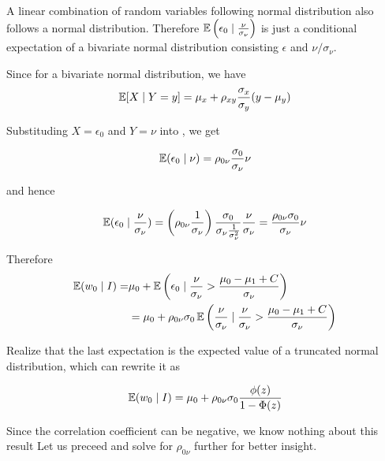 A linear combination of random variables following normal distribution
also follows a normal distribution. Therefore $\operatorname{\mathbb{E}}\left(\epsilon_0 \mid \frac{\nu}{\sigma_\nu}\right)$
is just a conditional expectation of a bivariate normal distribution
consisting $\epsilon$ and $\nu/\sigma_\nu$.

Since for a bivariate normal distribution, we have 
\begin{equation}
    \label{eq:biv-exp}
    \operatorname{\mathbb{E}}[X \mid Y=y] = \mu_x + \rho_{xy}\frac{\sigma_x}{\sigma_y}(y - \mu_y) 
\end{equation}

Substituding $X=\epsilon_0$ and $Y=\nu$ into , we get

\begin{equation}
    \label{eq:biv_normal_exp_0}
    \operatorname{\mathbb{E}}(\epsilon_0 \mid \nu)=\rho_{0\nu}\frac{\sigma_0}{\sigma_\nu}\nu
\end{equation}

and hence

\begin{equation*}
    \operatorname{\mathbb{E}}(\epsilon_0 \mid \frac{\nu}{\sigma_\nu})=
    \left(\rho_{0\nu} \frac{1}{\sigma_\nu}\right)
    \frac{\sigma_0}{\sigma_\nu \frac{1}{\sigma_\nu^2}}
    \frac{\nu}{\sigma_\nu}=\frac{\rho_{0\nu}\sigma_0 }{\sigma_\nu}\nu
\end{equation*}

Therefore
\begin{align}
    \operatorname{\mathbb{E}}(w_{0} \mid I) =& 
     \mu_0 + \operatorname{\mathbb{E}} \left(
            \epsilon_0 \mid \frac{\nu}{\sigma_\nu} > \frac{\mu_0 - \mu_1 + C}{\sigma_\nu}
            \right) \nonumber \\
    &= \mu_0 + \rho_{0\nu}\sigma_0 \operatorname{\mathbb{E}} \left(
        \frac{\nu}{\sigma_\nu} 
        \mid
        \frac{\nu}{\sigma_\nu} > \frac{\mu_0 - \mu_1 + C}{\sigma_\nu}
    \right) \label{eq:before_trunc}
\end{align}

Realize that the last expectation 
is the expected value of a truncated normal distribution, 
which can rewrite it as 

\begin{equation}
    \label{eq:exp_wo_1}
    \operatorname{\mathbb{E}}(w_{0} \mid I) = 
    \mu_0 + \rho_{0\nu}\sigma_0 \frac{\phi(z)}{1-\Phi(z)}
\end{equation}

Since the correlation coefficient can be negative,
 we know nothing about this result
Let us preceed and solve for $\rho_{0\nu}$ 
further for better insight. 



